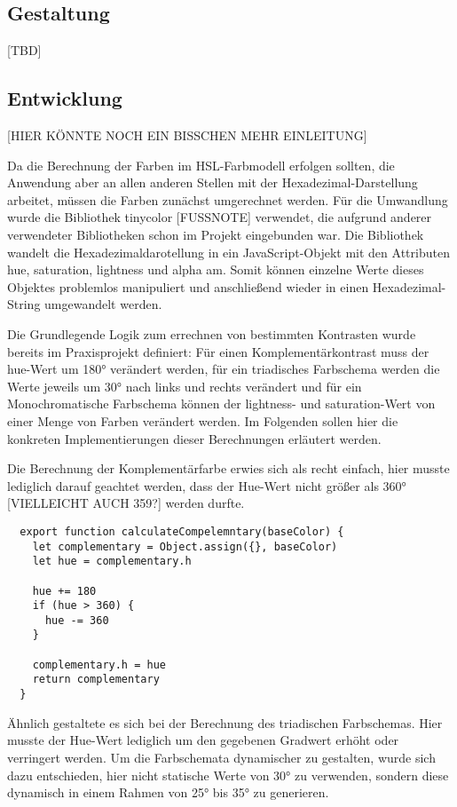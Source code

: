 \subsection{Gestaltung}
[TBD]

\subsection{Entwicklung}

[HIER KÖNNTE NOCH EIN BISSCHEN MEHR EINLEITUNG]

Da die Berechnung der Farben im HSL-Farbmodell erfolgen sollten, die Anwendung aber an allen anderen Stellen mit der Hexadezimal-Darstellung arbeitet, müssen die Farben zunächst umgerechnet werden. Für die Umwandlung wurde die Bibliothek tinycolor [FUSSNOTE] verwendet, die aufgrund anderer verwendeter Bibliotheken schon im Projekt eingebunden war.
Die Bibliothek wandelt die Hexadezimaldarotellung in ein JavaScript-Objekt mit den Attributen hue, saturation, lightness und alpha am. Somit können einzelne Werte dieses Objektes problemlos manipuliert und anschließend wieder in einen Hexadezimal-String umgewandelt werden.

Die Grundlegende Logik zum errechnen von bestimmten Kontrasten wurde bereits im Praxisprojekt definiert: Für einen Komplementärkontrast muss der hue-Wert um 180° verändert werden, für ein triadisches Farbschema werden die Werte jeweils um 30° nach links und rechts verändert und für ein Monochromatische Farbschema können der lightness- und saturation-Wert von einer Menge von Farben verändert werden.
Im Folgenden sollen hier die konkreten Implementierungen dieser Berechnungen erläutert werden.

Die Berechnung der Komplementärfarbe erwies sich als recht einfach, hier musste lediglich darauf geachtet werden, dass der Hue-Wert nicht größer als 360° [VIELLEICHT AUCH 359?] werden durfte.


\begin{lstlisting}
  export function calculateCompelemntary(baseColor) {
    let complementary = Object.assign({}, baseColor)
    let hue = complementary.h

    hue += 180
    if (hue > 360) {
      hue -= 360
    }

    complementary.h = hue
    return complementary
  }
\end{lstlisting}

Ähnlich gestaltete es sich bei der Berechnung des triadischen Farbschemas. Hier musste der Hue-Wert lediglich um den gegebenen Gradwert erhöht oder verringert werden. Um die Farbschemata dynamischer zu gestalten, wurde sich dazu entschieden, hier nicht statische Werte von 30° zu verwenden, sondern diese dynamisch in einem Rahmen von 25° bis 35° zu generieren.

